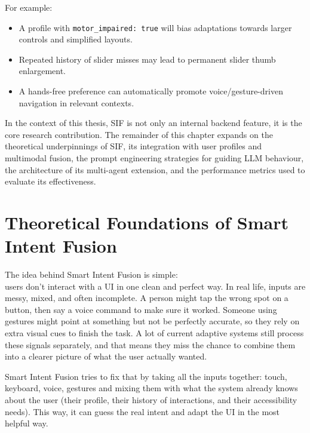 \documentclass[openany]{book}
\begin{document}
For example:
\begin{itemize}
    \item A profile with \texttt{motor\_impaired: true} will bias adaptations towards larger controls and simplified layouts.
    \item Repeated history of slider misses may lead to permanent slider thumb enlargement.
    \item A hands-free preference can automatically promote voice/gesture-driven navigation in relevant contexts.
\end{itemize}

In the context of this thesis, SIF is not only an internal backend feature, it is the core research contribution.
The remainder of this chapter expands on the theoretical underpinnings of SIF, its integration with user profiles and multimodal fusion, the prompt engineering strategies for guiding LLM behaviour, the architecture of its multi-agent extension, and the performance metrics used to evaluate its effectiveness.

\section{Theoretical Foundations of Smart Intent Fusion}
The idea behind Smart Intent Fusion is simple:
\\ users don’t interact with a UI in one clean and perfect way. In real life, inputs are messy, mixed, and often incomplete. A person might tap the wrong spot on a button, then say a voice command to make sure it worked. Someone using gestures might point at something but not be perfectly accurate, so they rely on extra visual cues to finish the task. A lot of current adaptive systems still process these signals separately, and that means they miss the chance to combine them into a clearer picture of what the user actually wanted.

Smart Intent Fusion tries to fix that by taking all the inputs together: touch, keyboard, voice, gestures and mixing them with what the system already knows about the user (their profile, their history of interactions, and their accessibility needs). This way, it can guess the real intent and adapt the UI in the most helpful way.
\end{document}
